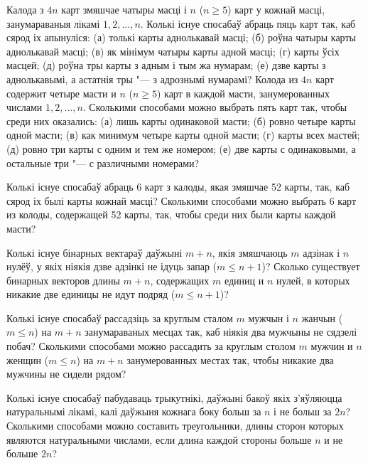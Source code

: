 \documentclass[12pt, a4paper]{article}
\begin{document}
\begin{problemList}
\bigskip

\problemItemSimple
{Калода з $4n$ карт змяшчае чатыры масці і $n$ ($n \ge 5$) карт у кожнай масці,
занумараваныя лікамі $1, 2, \ldots, n$. Колькі існуе спосабаў абраць пяць карт так,
каб сярод іх апынуліся: (а) толькі карты аднолькавай масці; (б) роўна чатыры карты
аднолькавай масці; (в) як мінімум чатыры карты адной масці; (г) карты ўсіх масцей;
(д) роўна тры карты з адным і тым жа нумарам; (е) дзве карты з аднолькавымі, а астатнія тры "---
з адрознымі нумарамі?}
{Колода из $4n$ карт содержит четыре масти и $n$ ($n \ge 5$) карт в
каждой масти, занумерованных числами $1, 2, \ldots, n$. Сколькими
способами можно выбрать пять карт так, чтобы среди них оказались: (а)
лишь карты одинаковой масти; (б) ровно четыре карты одной масти; (в)
как минимум четыре карты одной масти; (г) карты всех мастей; (д) ровно
три карты с одним и тем же номером; (е) две карты с одинаковыми, а
остальные три "--- с различными номерами?}

\bigskip

\problemItemSimple
{Колькі існуе спосабаў абраць 6 карт з калоды, якая змяшчае 52 карты, так,
каб сярод іх былі карты кожнай масці?}
{Сколькими способами можно выбрать 6 карт из колоды, содержащей 52
карты, так, чтобы среди них были карты каждой масти?}

\bigskip

\problemItemSimple
{Колькі існуе бінарных вектараў даўжыні $m + n$, якія змяшчаюць $m$ адзінак і
$n$ нулёў, у якіх ніякія дзве адзінкі не ідуць запар ($m \le n + 1$)?}
{Сколько существует бинарных векторов длины $m + n$, содержащих $m$
единиц и $n$ нулей, в которых никакие две единицы не идут подряд
($m \le n + 1$)?}

\bigskip

\problemItemSimple
{Колькі існуе спосабаў рассадзіць за круглым сталом $m$ мужчын і $n$ жанчын
($m \le n$) на $m + n$ занумараваных месцах так, каб ніякія два мужчыны не сядзелі побач?}
{Сколькими способами можно рассадить за круглым столом $m$ мужчин и $n$
женщин ($m \le n$) на $m + n$ занумерованных местах так, чтобы никакие
два мужчины не сидели рядом?}

\bigskip

\problemItemSimple
{Колькі існуе спосабаў пабудаваць трыкутнікі, даўжыні бакоў якіх з'яўляюцца натуральнымі лікамі,
калі даўжыня кожнага боку больш за $n$ і не больш за $2n$?}
{Сколькими способами можно составить треугольники, длины сторон которых
являются натуральными числами, если длина каждой стороны больше $n$ и
не больше $2n$?}


\end{problemList}
\end{document}

